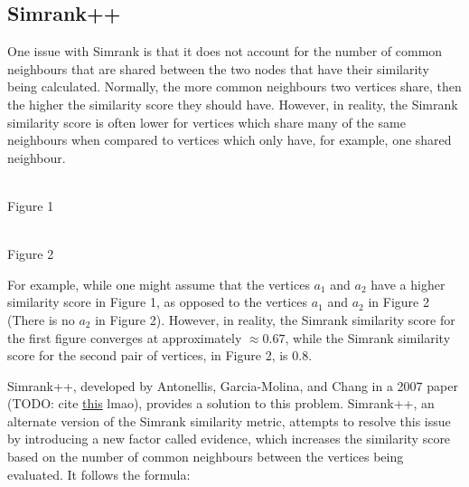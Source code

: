 \documentclass[fontsize=11pt]{article}
\begin{document}
\subsection{Simrank++}
One issue with Simrank is that it does not account for the number of common neighbours that are shared between the two nodes that have their similarity being calculated. Normally, the more common neighbours two vertices share, then the higher the similarity score they should have. However, in reality, the Simrank similarity score is often lower for vertices which share many of the same neighbours when compared to vertices which only have, for example, one shared neighbour. 

\begin{center}\\
Figure 1\\[1cm]
\\
Figure 2
\end{center}

For example, while one might assume that the vertices $a_1$ and $a_2$ have a higher similarity score in Figure 1, as opposed to the vertices $a_1$ and $a_2$ in Figure 2 (\color{red}There is no $a_2$ in Figure 2\color{black}). However, in reality, the Simrank similarity score for the first figure converges at approximately $\approx 0.67$, while the Simrank similarity score for the second pair of vertices, in Figure 2, is 0.8. 

Simrank++, developed by Antonellis, Garcia-Molina, and Chang in a 2007 paper (\color{red}TODO: cite \href{https://arxiv.org/pdf/0712.0499.pdf}{this} lmao\color{black}), provides a solution to this problem. Simrank++, an alternate version of the Simrank similarity metric, attempts to resolve this issue by introducing a new factor called evidence, which increases the similarity score based on the number of common neighbours between the vertices being evaluated. It follows the formula:
\end{document}
